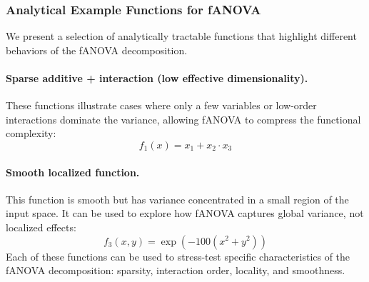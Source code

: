 
\subsubsection*{Analytical Example Functions for fANOVA}

We present a selection of analytically tractable functions that highlight different behaviors of the fANOVA decomposition.

\paragraph{Sparse additive + interaction (low effective dimensionality).}
These functions illustrate cases where only a few variables or low-order interactions dominate the variance, allowing fANOVA to compress the functional complexity:
\[
f_1(x) = x_1 + x_2 \cdot x_3
\]


\paragraph{Smooth localized function.}
This function is smooth but has variance concentrated in a small region of the input space. It can be used to explore how fANOVA captures global variance, not localized effects:
\[
f_3(x, y) = \exp\left(-100(x^2 + y^2)\right)
\]
Each of these functions can be used to stress-test specific characteristics of the fANOVA decomposition: sparsity, interaction order, locality, and smoothness.